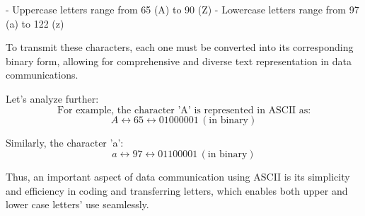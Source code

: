 - Uppercase letters range from 65 (A) to 90 (Z)
- Lowercase letters range from 97 (a) to 122 (z)

To transmit these characters, each one must be converted into its corresponding binary form, allowing for comprehensive and diverse text representation in data communications.

Let's analyze further:
\[
\text{For example, the character 'A' is represented in ASCII as:}
\]
\[
A \leftrightarrow 65 \leftrightarrow 01000001 \, (\text{in binary})
\]

Similarly, the character 'a':
\[
a \leftrightarrow 97 \leftrightarrow 01100001 \, (\text{in binary})
\]

Thus, an important aspect of data communication using ASCII is its simplicity and efficiency in coding and transferring letters, which enables both upper and lower case letters' use seamlessly.

